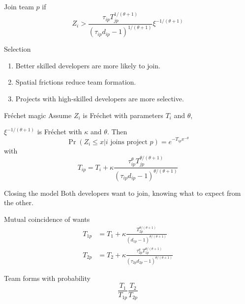 \documentclass[
  ignorenonframetext,
  aspectratio=169,
]{beamer}
\providecommand{\tightlist}{%
  \setlength{\itemsep}{0pt}\setlength{\parskip}{0pt}}
\begin{document}
\begin{frame}{Join team \(p\) if}
\protect\hypertarget{join-team-p-if}{}
\[
Z_i > \frac{\tau_{ip} T_{jp}^{1/(\theta+1)} }
{(\tau_{ip} d_{ip} - 1)^{1/(\theta+1)}} 
\xi^{-1/(\theta+1)}
\]

\begin{block}{Selection}
\protect\hypertarget{selection}{}
\begin{enumerate}
\tightlist
\item
  Better skilled developers are more likely to join.
\item
  Spatial frictions reduce team formation.
\item
  Projects with high-skilled developers are more selective.
\end{enumerate}
\end{block}
\end{frame}

\begin{frame}{Fréchet magic}
\protect\hypertarget{fruxe9chet-magic}{}
Assume \(Z_i\) is Fréchet with parameters \(T_i\) and \(\theta\),

\(\xi^{-1/(\theta+1)}\) is Fréchet with \(\kappa\) and \(\theta\). Then
\[
\Pr(Z_i \le x | i\text{ joins project }p) = e^{-T_{ip}x^{-\theta}}
\] with \[
T_{ip} = T_i + \kappa \frac{\tau_{ip}^\theta T_{jp}^{\theta/(\theta+1)} }
{(\tau_{ip} d_{ip} - 1)^{\theta/(\theta+1)}}
\]
\end{frame}

\begin{frame}{Closing the model}
\protect\hypertarget{closing-the-model}{}
Both developers want to join, knowing what to expect from the other.

\begin{block}{Mutual coincidence of wants}
\protect\hypertarget{mutual-coincidence-of-wants}{}
\[
\begin{aligned}
T_{1p} & = T_1 + \kappa \frac{T_{2p}^{\theta/(\theta+1)} }
{(d_{1p} - 1)^{\theta/(\theta+1)}} \\
T_{2p} &= T_2 + \kappa \frac{\tau_{2p}^\theta T_{1p}^{\theta/(\theta+1)} }
{(\tau_{2p} d_{2p} - 1)^{\theta/(\theta+1)}}
\end{aligned}
\]
\end{block}

\begin{block}{Team forms with probability}
\protect\hypertarget{team-forms-with-probability}{}
\[
\frac{T_1}{T_{1p}}
\frac{T_2}{T_{2p}}
\]
\end{block}
\end{frame}
\end{document}
